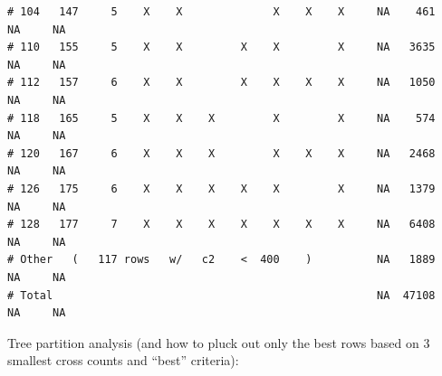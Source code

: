 \documentclass{article}\usepackage[]{graphicx}\usepackage[]{color}
\makeatletter
\newenvironment{kframe}{%
 \def\at@end@of@kframe{}%
 \ifinner\ifhmode%
  \def\at@end@of@kframe{\end{minipage}}%
  \begin{minipage}{\columnwidth}%
 \fi\fi%
 \def\FrameCommand##1{\hskip\@totalleftmargin \hskip-\fboxsep
 \colorbox{shadecolor}{##1}\hskip-\fboxsep
     \hskip-\linewidth \hskip-\@totalleftmargin \hskip\columnwidth}%
 \MakeFramed {\advance\hsize-\width
   \@totalleftmargin\z@ \linewidth\hsize
   \@setminipage}}%
 {\par\unskip\endMakeFramed%
 \at@end@of@kframe}
\newenvironment{knitrout}{}{} %
\makeatother
\begin{document}
\begin{knitrout}
\begin{kframe}
\begin{verbatim}
# 104   147     5    X    X              X    X    X     NA    461     NA     NA
# 110   155     5    X    X         X    X         X     NA   3635     NA     NA
# 112   157     6    X    X         X    X    X    X     NA   1050     NA     NA
# 118   165     5    X    X    X         X         X     NA    574     NA     NA
# 120   167     6    X    X    X         X    X    X     NA   2468     NA     NA
# 126   175     6    X    X    X    X    X         X     NA   1379     NA     NA
# 128   177     7    X    X    X    X    X    X    X     NA   6408     NA     NA
# Other   (   117 rows   w/   c2    <  400    )          NA   1889     NA     NA
# Total                                                  NA  47108     NA     NA
\end{verbatim}
\end{kframe}
\end{knitrout}

Tree partition analysis (and how to pluck out only the best rows based on 3 smallest cross counts and ``best'' criteria):
\end{document}
